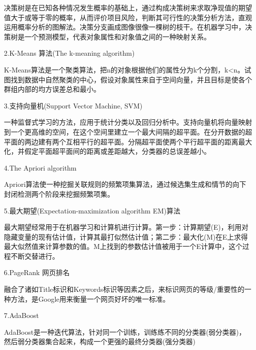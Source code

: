 \documentclass[openbib]{article}
\begin{document}
	决策树是在已知各种情况发生概率的基础上，通过构成决策树来求取净现值的期望值大于或等于零的概率，从而评价项目风险，判断其可行性的决策分析方法，直观运用概率分析的图解法。决策分支画成图像很像一棵树的枝干。在机器学习中，决策树是一个预测模型，代表对象属性和对象值之间的一种映射关系。
	
	\begin{center}
		2.K-Means 算法(The k-meaning algorithm)
	\end{center}

	K-Means算法是一个聚类算法，把n的对象根据他们的属性分为k个分割，k<n。试图找到数据中自然聚类的中心，假设对象属性来自于空间向量，并且目标是使各个群组内部的均方误差总和最小。
	
	\begin{center}
		3.支持向量机(Support Vector Machine, SVM)
	\end{center}

	一种监督式学习的方法，应用于统计分类以及回归分析中。支持向量机将向量映射到一个更高维的空间，在这个空间里建立一个最大间隔的超平面。在分开数据的超平面的两边建有两个互相平行的超平面。分隔超平面使两个平行超平面的距离最大化，并假定平面超平面间的距离或差距越大，分类器的总误差越小。
	
	\begin{center}
		4.The Apriori algorithm
	\end{center}

	Apriori算法使一种挖掘关联规则的频繁项集算法，通过候选集生成和情节的向下封闭检测两个阶段来挖掘频繁项集。
	
	\begin{center}
		5.最大期望(Expectation-maximization algorithm EM)算法
	\end{center}
	
	最大期望经常用于在机器学习和计算机进行计算。第一步：计算期望(E)，利用对隐藏变量的现有估计值，计算其最打似然估计值；第二步：最大化(M)在E上求得最大似然值来计算参数的值。M上找到的参数估计值被用于一个E计算中，这个过程不断交替进行。
	
	\begin{center}
		6.PageRank 网页排名
	\end{center}

	融合了诸如Title标识和Keywords标识等因素之后，来标识网页的等级/重要性的一种方法，是Google用来衡量一个网页好坏的唯一标准。

	\begin{center}
		7.AdaBoost
	\end{center}

	AdaBoost是一种迭代算法，针对同一个训练，训练练不同的分类器(弱分类器)，然后弱分类器集合起来，构成一个更强的最终分类器(强分类器)
	
\end{document}
